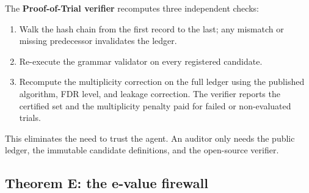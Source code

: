 \documentclass[sigconf]{acmart}
\theoremstyle{plain}
\begin{document}
\begin{table}[t]
\caption{Canonical fields in the trials ledger. Every row records a state
  transition, and the final ledger is exported as a hash-chained JSON-lines
  file.}
\label{tab:ledger}
\footnotesize
{}
\end{table}

The \textbf{Proof-of-Trial verifier} recomputes three independent checks:
\begin{enumerate}
\item Walk the hash chain from the first record to the last; any mismatch or
  missing predecessor invalidates the ledger.
\item Re-execute the grammar validator on every registered candidate.
\item Recompute the multiplicity correction on the full ledger using the
  published algorithm, FDR level, and leakage correction. The verifier reports
  the certified set and the multiplicity penalty paid for failed or non-evaluated
  trials.
\end{enumerate}
This eliminates the need to trust the agent. An auditor only needs the public
ledger, the immutable candidate definitions, and the open-source verifier.

\subsection{Theorem E: the e-value firewall}\label{sec:theorem-e}
\end{document}
